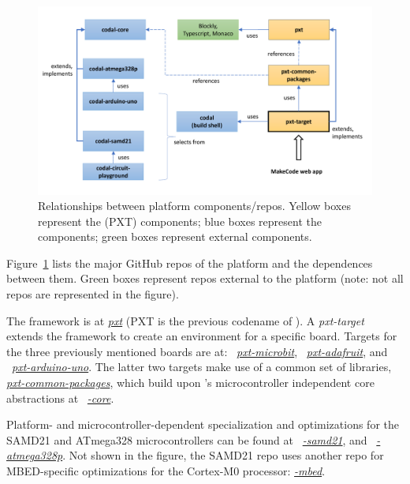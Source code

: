 
\begin{figure}[t]
    \includegraphics[width=5.5in]{reposFig.pdf}
    \caption{\label{fig:repos}Relationships between platform components/repos. Yellow boxes represent the \MC (PXT) components; blue
    boxes represent the \CO components; green boxes represent external components.}
  \end{figure}
  

Figure~\ref{fig:repos} lists the major GitHub repos of the platform
and the dependences between them. Green boxes represent repos external to the platform
(note: not all repos are represented in the figure).

The \MC framework
is at \emph{\href{https://github.com/microsoft/pxt}{pxt}} (PXT is the previous codename of \MCN).
A \emph{pxt-target} extends the framework to create an environment for a specific board. Targets
for the three previously mentioned boards are at:
~\emph{\href{https://github.com/microsoft/pxt-microbit}{pxt-microbit}},
~\emph{\href{https://github.com/microsoft/pxt-adafruit}{pxt-adafruit}}, and
~\emph{\href{https://github.com/microsoft/pxt-arduino-uno}{pxt-arduino-uno}}.
The latter two targets make use of a common set of libraries,
\emph{\href{https://github.com/microsoft/pxt-common-packages}{pxt-common-packages}},
which build upon \CON's microcontroller independent core abstractions at
~\emph{\href{https://github.com/lancaster-university/\CO-core}{\COLN-core}}.

Platform- and microcontroller-dependent specialization and optimizations for
the SAMD21 and ATmega328 microcontrollers can be found at
~\emph{\href{https://github.com/lancaster-university/codal-samd21}{\COLN-samd21}},
and
~\emph{\href{https://github.com/lancaster-university/codal-atmega328p}{\COLN-atmega328p}}.
Not shown in the figure, the SAMD21 repo uses another repo for
MBED-specific optimizations for the Cortex-M0 processor: \emph{\href{https://github.com/lancaster-university/codal-mbed}{\COLN-mbed}}.

